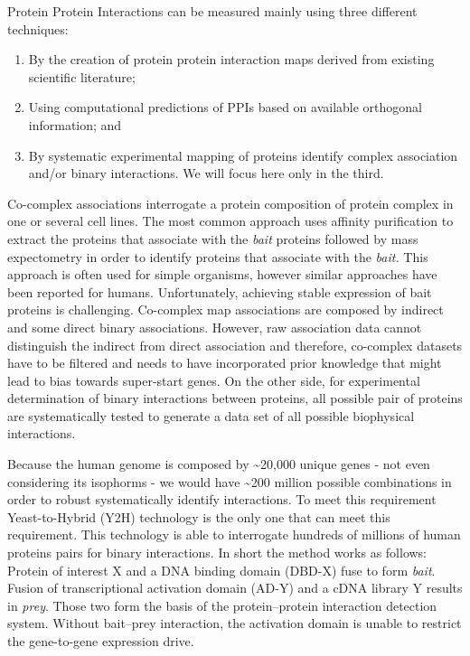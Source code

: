 \documentclass[
]{book}
\begin{document}
Protein Protein Interactions can be measured mainly using three different techniques:

\begin{enumerate}
\def\labelenumi{\arabic{enumi}.}
\item
  By the creation of protein protein interaction maps derived from existing scientific literature;
\item
  Using computational predictions of PPIs based on available orthogonal information; and
\item
  By systematic experimental mapping of proteins identify complex association and/or binary interactions. We will focus here only in the third.
\end{enumerate}

Co-complex associations interrogate a protein composition of protein complex in one or several cell lines. The most common approach uses affinity purification to extract the proteins that associate with the \emph{bait} proteins followed by mass expectometry in order to identify proteins that associate with the \emph{bait.} This approach is often used for simple organisms, however similar approaches have been reported for humans. Unfortunately, achieving stable expression of bait proteins is challenging. Co-complex map associations are composed by indirect and some direct binary associations. However, raw association data cannot distinguish the indirect from direct association and therefore, co-complex datasets have to be filtered and needs to have incorporated prior knowledge that might lead to bias towards super-start genes. On the other side, for experimental determination of binary interactions between proteins, all possible pair of proteins are systematically tested to generate a data set of all possible biophysical interactions.

Because the human genome is composed by \textasciitilde20,000 unique genes - not even considering its isophorms - we would have \textasciitilde200 million possible combinations in order to robust systematically identify interactions. To meet this requirement Yeast-to-Hybrid (Y2H) technology is the only one that can meet this requirement. This technology is able to interrogate hundreds of millions of human proteins pairs for binary interactions. In short the method works as follows: Protein of interest X and a DNA binding domain (DBD-X) fuse to form \emph{bait}. Fusion of transcriptional activation domain (AD-Y) and a cDNA library Y results in \emph{prey}. Those two form the basis of the protein--protein interaction detection system. Without bait--prey interaction, the activation domain is unable to restrict the gene-to-gene expression drive.
\end{document}
